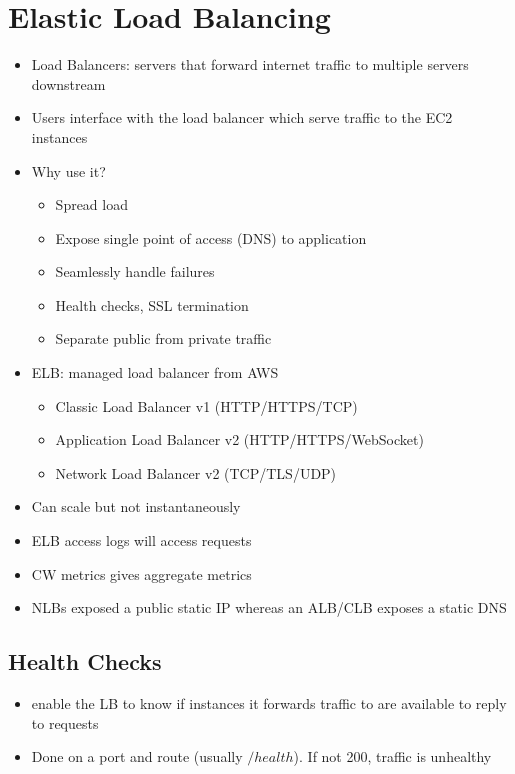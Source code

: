 \documentclass[]{scrartcl}
\begin{document}
\section{Elastic Load Balancing}
\begin{itemize}
	\item Load Balancers: servers that forward internet traffic to multiple servers downstream
	\item Users interface with the load balancer which serve traffic to the EC2 instances
	\item Why use it?
	\begin{itemize}
		\item Spread load
		\item Expose single point of access (DNS) to application
		\item Seamlessly handle failures
		\item Health checks, SSL termination
		\item Separate public from private traffic
	\end{itemize}
	\item ELB: managed load balancer from AWS
	\begin{itemize}
		\item Classic Load Balancer v1 (HTTP/HTTPS/TCP)
		\item Application Load Balancer v2 (HTTP/HTTPS/WebSocket)
		\item Network Load Balancer v2 (TCP/TLS/UDP)
	\end{itemize}
	\item Can scale but not instantaneously
	\item ELB access logs will access requests
	\item CW metrics gives aggregate metrics
	\item NLBs exposed a public static IP whereas an ALB/CLB exposes a static DNS
\end{itemize}

\subsection{Health Checks}
\begin{itemize}
	\item enable the LB to know if instances it forwards traffic to are available to reply to requests
	\item Done on a port and route (usually $/health$). If not 200, traffic is unhealthy
\end{itemize}
\end{document}
